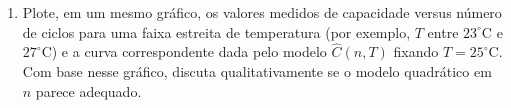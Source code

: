\documentclass[a4paper,12pt]{article}
\begin{document}
\begin{enumerate}
\begin{enumerate}
    \item Plote, em um mesmo gráfico, os valores medidos de capacidade versus número de ciclos para uma faixa estreita de temperatura (por exemplo, $T$ entre $23^\circ$C e $27^\circ$C) e a curva correspondente dada pelo modelo $\hat{C}(n,T)$ fixando $T = 25^\circ$C. 
    Com base nesse gráfico, discuta qualitativamente se o modelo quadrático em $n$ parece adequado.

\end{enumerate}

\end{enumerate}
\end{document}
